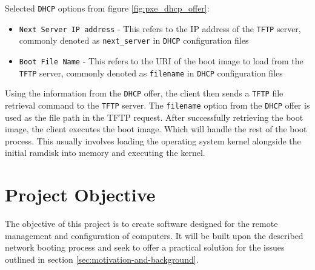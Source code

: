 \documentclass[../main.tex]{subfiles}
\begin{document}
Selected \texttt{DHCP} options from figure \ref{fig:pxe_dhcp_offer}:

\begin{itemize}
  \item \texttt{Next Server IP address} - This refers to the IP address of the \texttt{TFTP} server, commonly denoted as \texttt{next\_server} in \texttt{DHCP} configuration files
  \item \texttt{Boot File Name} - This refers to the URI of the boot image to load from the \texttt{TFTP} server, commonly denoted as \texttt{filename} in \texttt{DHCP} configuration files
\end{itemize}

Using the information from the \texttt{DHCP} offer, the client then sends a \texttt{TFTP} file retrieval command to the \texttt{TFTP} server.
The \texttt{filename} option from the \texttt{DHCP} offer is used as the file path in the TFTP request.
After successfully retrieving the boot image, the client executes the boot image. Which will handle the rest of the boot process.
This usually involves loading the operating system kernel alongside the initial ramdisk into memory and executing the kernel.

\section{Project Objective}

The objective of this project is to create software designed for the remote management and configuration of computers.
It will be built upon the described network booting process and seek to offer a practical solution for the issues outlined in section \ref{sec:motivation-and-background}.
\end{document}
